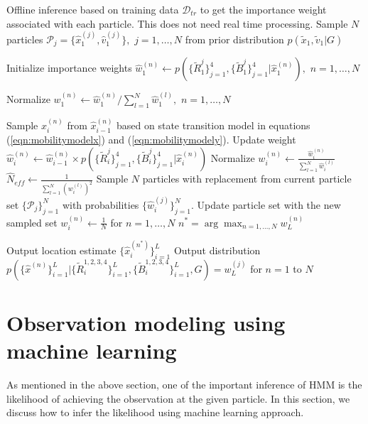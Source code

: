 \documentclass[conference, 10pt]{IEEEtran}
\begin{document}
\begin{NoHyper}
\begin{algorithm}
\caption{$5GLocalizeAlgo(\mathcal{D}_{tr},G,N_{th})$}
\label{alg:LocalizeUEpf}
\begin{algorithmic}[1]
\State Offline inference based on training data $\mathcal{D}_{tr}$ to get the importance weight associated with each particle. This does not need real time processing.
\State Sample $N$ particles $\mathcal{P}_j = \{\hat{x}_1^{(j)},\hat{v}_1^{(j)}\},$ $j=1,\hdots , N$ 
from prior distribution $p(\tilde{x}_1, \tilde{v}_1|G)$ 

\State Initialize importance weights $\hat{w}_1^{(n)} \gets p(\{\tilde{R}^j_1\}_{j=1}^4,\{\tilde{B}^j_1\}_{j=1}^4|\hat{x}_1^{(n)}),$ $n=1,\hdots , N$

\State Normalize $w_1^{(n)} \gets \hat{w}_1^{(n)}/\sum_{l=1}^N \hat{w}_1^{(l)},$ $n=1,\hdots , N$

		\State Sample $\hat{x}_i^{(n)}$ from $\hat{x}_{i-1}^{(n)}$ based on state transition model in equations (\ref{eqn:mobilitymodelx}) and (\ref{eqn:mobilitymodely}).
		\State Update weight $\hat{w}_i^{(n)} \gets \hat{w}_{i-1}^{(n)} \times p(\{\tilde{R}^j_i\}_{j=1}^4, \{\tilde{B}^j_i\}_{j=1}^4|\hat{x}_{i}^{(n)})$ 
	\EndFor
	\State Normalize $w_i^{(n)} \gets \frac{\hat{w}_i^{(n)}}{\sum_{l=1}^N \hat{w}_i^{(l)}}$
	\State $\hat{N}_{eff} \gets \frac{1}{\sum_{l=1}^N (w_{i}^{(l)})^2}$
		\State Sample $N$ particles with replacement from current particle set $\{\mathcal{P}_j\}_{j=1}^N$ with probabilities $\{\hat{w}_i^{(j)}\}_{j=1}^N.$ Update particle set with the new sampled set
		\State $w_i^{(n)} \gets \frac{1}{N}$ for $n=1,\hdots , N$
	\EndIf
\EndFor
\State $n^* = \arg \max_{n = 1 , \hdots, N} w_L^{(n)}$

\State Output location estimate $\{\hat{x}_i^{(n^*)}\}_{i=1}^L$ 
\State Output distribution \\
$p(\{\hat{x}^{(n)}\}_{i=1}^L|\{\tilde{R}^{1,2,3,4}_i\}_{i=1}^L,\{\tilde{B}^{1,2,3,4}_i\}_{i=1}^L,G) = w_L^{(j)}$ for $n=1$ to $N$
\end{algorithmic}
\end{algorithm}  


\section{Observation modeling using machine learning}
\label{sec:channel-model}
As mentioned in the above section, one of the important inference of HMM is the likelihood of achieving the observation at the given particle. In this section, we discuss how to infer the likelihood using machine learning approach. 

\end{NoHyper}
\end{document}
